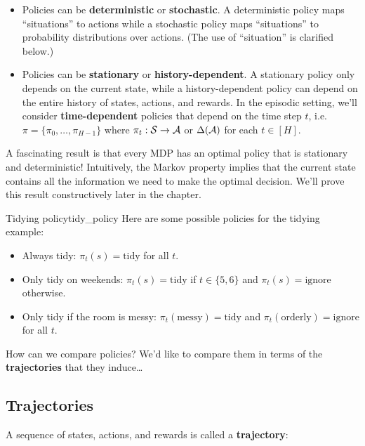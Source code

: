 \documentclass[../main/main]{subfiles}
\begin{document}
\begin{itemize}
    \item Policies can be \textbf{deterministic} or \textbf{stochastic}. A deterministic policy maps ``situations'' to actions while a stochastic policy maps ``situations'' to probability distributions over actions. (The use of ``situation'' is clarified below.)
    \item Policies can be \textbf{stationary} or \textbf{history-dependent}. A stationary policy only depends on the current state, while a history-dependent policy can depend on the entire history of states, actions, and rewards. In the episodic setting, we'll consider \textbf{time-dependent} policies that depend on the time step $t$, i.e. $\pi = \{ \pi_0, \dots, \pi_{H-1} \}$ where $\pi_t : \mathcal{S} \to \mathcal{A}$ or $\Delta(\mathcal{A})$ for each $t \in [H]$.
\end{itemize}

A fascinating result is that every MDP has an optimal policy that is stationary and deterministic! Intuitively, the Markov property implies that the current state contains all the information we need to make the optimal decision. We'll prove this result constructively later in the chapter.


\begin{example}{Tidying policy}{tidy_policy}
    Here are some possible policies for the tidying example:

    \begin{itemize}
        \item Always tidy: $\pi_t(s) = \text{tidy}$ for all $t$.
        \item Only tidy on weekends: $\pi_t(s) = \text{tidy}$ if $t \in \{ 5, 6 \}$ and $\pi_t(s) = \text{ignore}$ otherwise.
        \item Only tidy if the room is messy: $\pi_t(\text{messy}) = \text{tidy}$ and $\pi_t(\text{orderly}) = \text{ignore}$ for all $t$.
    \end{itemize}
\end{example}

How can we compare policies? We'd like to compare them in terms of the \textbf{trajectories} that they induce\dots

\subsection{Trajectories}

A sequence of states, actions, and rewards is called a \textbf{trajectory}:
\end{document}
